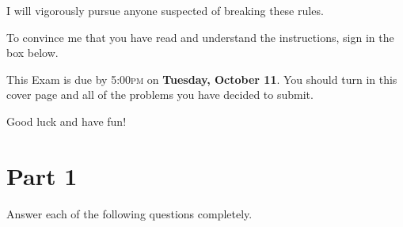 \documentclass[11pt]{article}
\theoremstyle{definition}
\begin{document}
I will vigorously pursue anyone suspected of breaking these rules. 

\bigskip

To convince me that you have read and understand the instructions, sign in the box below.

\bigskip

\setlength{\fboxsep}{10pt}


\bigskip

This Exam is due by 5:00\textsc{pm} on \textbf{Tuesday, October 11}.  You should turn in this cover page and all of the problems you have decided to submit.

\bigskip

Good luck and have fun!

\newpage

\section*{Part 1}

Answer each of the following questions completely.
\end{document}
